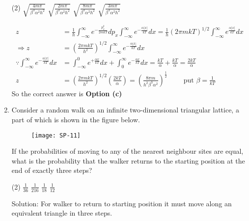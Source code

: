 \begin{enumerate}
	{	}
	\begin{tasks}(2)
		\task[\textbf{a.}] $\sqrt{\frac{4 m \pi}{\beta^{3} \alpha^{2} h^{2}}}$
		\task[\textbf{b.}] $\sqrt{\frac{2 m \pi}{\beta^{3} \alpha^{2} h^{2}}}$
		\task[\textbf{c.}]$\sqrt{\frac{8 m \pi}{\beta^{3} \alpha^{2} h^{2}}}$
		\task[\textbf{d.}] $\sqrt{\frac{3 m \pi}{\beta^{3} \alpha^{2} h^{2}}}$
	\end{tasks}
	\begin{answer}
		\begin{align*}
		z&=\frac{1}{h} \int_{-\infty}^{\infty} e^{-\frac{p_{x}^{2}}{2 m k T}} d p_{x} \int_{-\infty}^{\infty} e^{-\frac{\alpha|x|}{k T}} d x=\frac{1}{h}(2 \pi m k T)^{1 / 2} \int_{-\infty}^{\infty} e^{\frac{\alpha|x|}{k T}} d x\\
		\Rightarrow z&=\left(\frac{2 \pi m k T}{h^{2}}\right)^{1 / 2} \int_{-\infty}^{\infty} e^{-\frac{\alpha|x|}{k T}} d x\\
		\because \int_{-\infty}^{\infty} e^{-\frac{\alpha|x|}{k T}} d x&=\int_{-\infty}^{0} e^{+\frac{\alpha x}{k T}} d x+\int_{0}^{\infty} e^{-\frac{\alpha x}{k T}} d x=\frac{k T}{\alpha}+\frac{k T}{\alpha}=\frac{2 k T}{\alpha}\\
		z&=\left(\frac{2 \pi m k T}{h^{2}}\right)^{1 / 2}\left(\frac{2 k T}{\alpha}\right)=\left(\frac{8 \pi m}{h^{2} \beta^{3} \alpha^{2}}\right)^{\frac{1}{2}}\qquad
		\text{	put }\beta=\frac{1}{k T}
		\end{align*}
		So the correct answer is \textbf{Option (c)}
	\end{answer}
	\item Consider a random walk on an infinite two-dimensional triangular lattice, a part of which is shown in the figure below.
	\begin{figure}[H]
		\centering
		\texttt{[image: SP-11]}
	\end{figure}
	If the probabilities of moving to any of the nearest neighbour sites are equal, what is the probability that the walker returns to the starting position at the end of exactly three steps?
	{	}
	\begin{tasks}(2)
		\task[\textbf{a.}]$\frac{1}{36}$
		\task[\textbf{b.}]$\frac{1}{216}$
		\task[\textbf{c.}] $\frac{1}{18}$
		\task[\textbf{d.}] $\frac{1}{12}$
	\end{tasks}
	\begin{answer}
		Solution: For walker to return to starting position it must move along an equivalent triangle in three steps.\\

\end{answer}
\end{enumerate}

